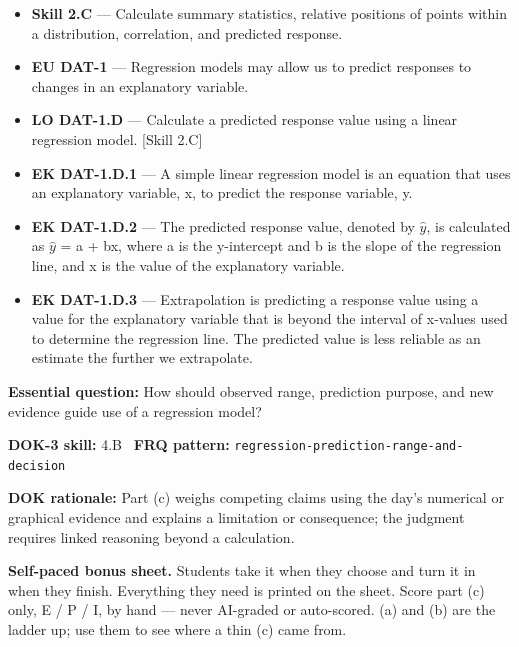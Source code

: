 \documentclass[11pt]{article}
\begin{document}


{\small
\begin{itemize}[leftmargin=1.5em,itemsep=2pt,topsep=2pt]
  \item \textbf{Skill 2.C} --- Calculate summary statistics, relative positions of points within a distribution, correlation, and predicted response.
  \item \textbf{EU DAT-1} --- Regression models may allow us to predict responses to changes in an explanatory variable.
  \item \textbf{LO DAT-1.D} --- Calculate a predicted response value using a linear regression model. [Skill 2.C]
  \item \textbf{EK DAT-1.D.1} --- A simple linear regression model is an equation that uses an explanatory variable, x, to predict the response variable, y.
  \item \textbf{EK DAT-1.D.2} --- The predicted response value, denoted by $\widehat{y}$, is calculated as $\widehat{y}$ = a + bx, where a is the y-intercept and b is the slope of the regression line, and x is the value of the explanatory variable.
  \item \textbf{EK DAT-1.D.3} --- Extrapolation is predicting a response value using a value for the explanatory variable that is beyond the interval of x-values used to determine the regression line. The predicted value is less reliable as an estimate the further we extrapolate.
\end{itemize}
}
\textbf{Essential question:} How should observed range, prediction purpose, and new evidence guide use of a regression model?\par
\textbf{DOK-3 skill:} 4.B \textperiodcentered\ \textbf{FRQ pattern:} {\small\texttt{regression-\allowbreak{}prediction-\allowbreak{}range-\allowbreak{}and-\allowbreak{}decision}}\par
\textbf{DOK rationale:} Part (c) weighs competing claims using the day's numerical or graphical evidence and explains a limitation or consequence; the judgment requires linked reasoning beyond a calculation.\par

\textbf{Self-paced bonus sheet.} Students take it when they choose and turn it in when they finish. Everything they need is printed on the sheet. Score part (c) only, E / P / I, by hand --- never AI-graded or auto-scored. (a) and (b) are the ladder up; use them to see where a thin (c) came from.\par
\end{document}
